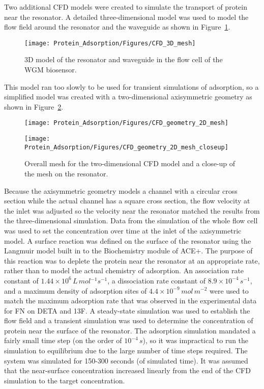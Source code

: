 Two additional CFD models were created to simulate the transport of
protein near the resonator. A detailed three-dimensional model was
used to model the flow field around the resonator and the waveguide
as shown in Figure~\ref{fig:CFD 3D resonator}.%
\begin{figure}
\texttt{[image: Protein\_Adsorption/Figures/CFD\_3D\_mesh]}

\caption{\label{fig:CFD 3D resonator}3D model of the resonator and waveguide
in the flow cell of the WGM biosensor.}


%
\end{figure}
 This model ran too slowly to be used for transient simulations of
adsorption, so a simplified model was created with a two-dimensional
axisymmetric geometry as shown in Figure~\ref{fig:CFD Mesh 2D}.%
\begin{figure}
\texttt{[image: Protein\_Adsorption/Figures/CFD\_geometry\_2D\_mesh]}

\texttt{[image: Protein\_Adsorption/Figures/CFD\_geometry\_2D\_mesh\_closeup]}

\caption{\label{fig:CFD Mesh 2D}Overall mesh for the two-dimensional CFD model
and a close-up of the mesh on the resonator.}


%
\end{figure}
 Because the axisymmetric geometry models a channel with a circular
cross section while the actual channel has a square cross section,
the flow velocity at the inlet was adjusted so the velocity near the
resonator matched the results from the three-dimensional simulation.
Data from the simulation of the whole flow cell was used to set the
concentration over time at the inlet of the axisymmetric model. A
surface reaction was defined on the surface of the resonator using
the Langmuir model built in to the Biochemistry module of ACE+. The
purpose of this reaction was to deplete the protein near the resonator
at an appropriate rate, rather than to model the actual chemistry
of adsorption. An association rate constant of $1.44\times10^{6}\, L\, mol{}^{-1}s^{-1}$,
a dissociation rate constant of $8.9\times10^{-4}\, s^{-1}$, and
a maximum density of adsorption sites of $4.4\times10^{-9}\, mol\, m^{-2}$
were used to match the maximum adsorption rate that was observed in
the experimental data for FN on DETA and 13F. A steady-state simulation
was used to establish the flow field and a transient simulation was
used to determine the concentration of protein near the surface of
the resonator. The adsorption simulation mandated a fairly small time
step (on the order of $10^{-4}\, s$), so it was impractical to run
the simulation to equilibrium due to the large number of time steps
required. The system was simulated for 150-300 seconds (of simulated
time). It was assumed that the near-surface concentration increased
linearly from the end of the CFD simulation to the target concentration.


